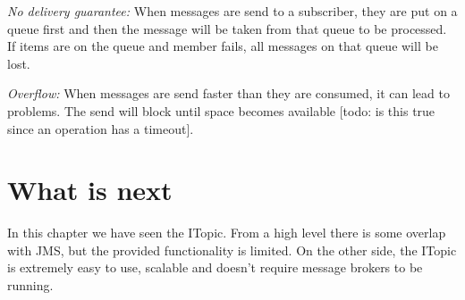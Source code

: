\emph{No delivery guarantee:} When messages are send to a subscriber, they are put on a queue first and then the message will be taken from that queue to be processed. If items are on the queue and member fails, all messages on that queue will be lost.

\emph{Overflow:} When messages are send faster than they are consumed, it can lead to problems. The send will block until space becomes available [todo: is this true since an operation has a timeout]. 

\section{What is next}
In this chapter we have seen the ITopic. From a high level there is some overlap with JMS, but the provided functionality is limited. On the other side, the ITopic is extremely easy to use, scalable and doesn't require message brokers to be running.
